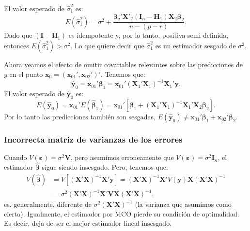 \documentclass[
]{article}
\begin{document}
El valor esperado de \(\widehat{\sigma}^{2}_{1}\) es:
\[
E(\widehat{\sigma}^{2}_{1}) = \sigma^{2} + \frac{\boldsymbol \beta_{2}'\boldsymbol X'_{2}(\boldsymbol I_{n} - \boldsymbol H_{1})\boldsymbol X_{2}\boldsymbol \beta_{2}}{n-(p-r)}.
\]
Dado que \((\boldsymbol I- \boldsymbol H_{1})\) es idempotente y, por lo tanto, positiva semi-definida, entonces \(E(\widehat{\sigma}_{1}^{2}) > \sigma^{2}\). Lo que quiere decir que \(\widehat{\sigma}^{2}_{1}\) es un estimador sesgado de \(\sigma^{2}\).

Ahora veamos el efecto de omitir covariables relevantes sobre las predicciones de \(y\) en el punto \(\boldsymbol x_{0} = (\boldsymbol x_{01}', \boldsymbol x_{02}')'\). Tenemos que:
\[
\widehat{\boldsymbol y}_{0} = \boldsymbol x_{01}'\widehat{\boldsymbol \beta}_{1} = \boldsymbol x_{01}'(\boldsymbol X_{1}'\boldsymbol X_{1})^{-1}\boldsymbol X_{1}'\boldsymbol y.
\]
El valor esperado de \(\widehat{\boldsymbol y}_{0}\) es:
\[
E(\widehat{\boldsymbol y}_{0}) = \boldsymbol x_{01}'E(\widehat{\boldsymbol \beta}_{1}) = \boldsymbol x_{01}'\left[ \boldsymbol \beta_{1} +  (\boldsymbol X_{1}'\boldsymbol X_{1})^{-1}\boldsymbol X_{1}'\boldsymbol X_{2}\boldsymbol \beta_{2} \right]. 
\]
Por lo tanto las predicciones también son sesgadas, \(E(\widehat{\boldsymbol y}_{0}) \neq \boldsymbol x_{01}'\boldsymbol \beta_{1} + \boldsymbol x_{02}'\boldsymbol \beta_{2}\).

\hypertarget{incorrecta-matriz-de-varianzas-de-los-errores}{%
\subsubsection{Incorrecta matriz de varianzas de los errores}\label{incorrecta-matriz-de-varianzas-de-los-errores}}

Cuando \(V(\boldsymbol \varepsilon) = \sigma^{2}\boldsymbol V\), pero asumimos erroneamente que \(V(\boldsymbol \varepsilon) = \sigma^{2}\boldsymbol I_{n}\), el estimador \(\widehat{\boldsymbol \beta}\) sigue siendo insesgado. Pero, tenemos que:
\begin{equation}
\begin{split}
V(\widehat{\boldsymbol \beta}) &= V\left[ (\boldsymbol X'\boldsymbol X)^{-1}\boldsymbol X'\boldsymbol y\right] = (\boldsymbol X'\boldsymbol X)^{-1}\boldsymbol X'V(\boldsymbol y)\boldsymbol X(\boldsymbol X'\boldsymbol X)^{-1} \\
&= \sigma^{2}(\boldsymbol X'\boldsymbol X)^{-1}\boldsymbol X'\boldsymbol V\boldsymbol X(\boldsymbol X'\boldsymbol X)^{-1},
\end{split}
\nonumber
\end{equation}
es, generalmente, diferente de \(\sigma^{2}(\boldsymbol X'\boldsymbol X)^{-1}\) (la varianza que asumimos como cierta). Igualmente, el estimador por MCO pierde su condición de optimalidad. Es decir, deja de ser el mejor estimador lineal insesgado.
\end{document}
